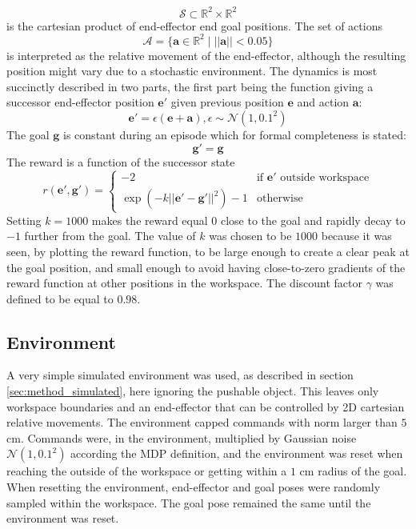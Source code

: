 \begin{equation}
    \mathcal{S} \subset \mathbb{R}^2 \times \mathbb{R}^2
\end{equation}
is the cartesian product of end-effector end goal positions. The set of actions
\begin{equation}
    \mathcal{A} = \lbrace \mathbf{a} \in \mathbb{R}^2 \mid ||\mathbf{a}|| < 0.05 \rbrace
\end{equation}
is interpreted as the relative movement of the end-effector, although the
resulting position might vary due to a stochastic environment. The dynamics is
most succinctly described in two parts, the first part being the function
giving a successor end-effector position $\mathbf{e}'$ given previous position
$\mathbf{e}$ and action $\mathbf{a}$:
\begin{equation}
    \mathbf{e}' = \epsilon(\mathbf{e} + \mathbf{a}), \epsilon \sim \mathcal{N}(1, 0.1^2)
\end{equation}
The goal $\mathbf{g}$ is constant during an episode which for formal
completeness is stated:
\begin{equation}
    \mathbf{g}' = \mathbf{g}
\end{equation}
The reward is a function of the successor state
\begin{equation}
    r(\mathbf{e', g'}) =
    \begin{cases}
        -2 &\text{if } \mathbf{e'} \text{ outside workspace}\\
        \exp\left(-k||\mathbf{e'} - \mathbf{g'}||^2\right) - 1 &\text{otherwise}
    \end{cases}
\end{equation}
Setting $k = 1000$ makes the reward equal $0$ close to the goal and rapidly
decay to $-1$ further from the goal. The value of $k$ was chosen to be $1000$
because it was seen, by plotting the reward function, to be large enough to
create a clear peak at the goal position, and small enough to avoid having
close-to-zero gradients of the reward function at other positions in the
workspace.
The discount factor $\gamma$ was defined to be equal to $0.98$.

\subsection{Environment}

A very simple simulated environment was used, as described in section
\ref{sec:method_simulated}, here ignoring the pushable object. This leaves only
workspace boundaries and an end-effector that can be controlled by 2D cartesian
relative movements. The environment capped commands with norm larger than $5$
cm. Commands were, in the environment, multiplied by Gaussian noise
$\mathcal{N}(1, 0.1^2)$ according the MDP definition, and the environment was
reset when reaching the outside of the workspace or getting within a $1$ cm
radius of the goal. When resetting the environment, end-effector and goal poses
were randomly sampled within the workspace. The goal pose remained the same
until the environment was reset.


